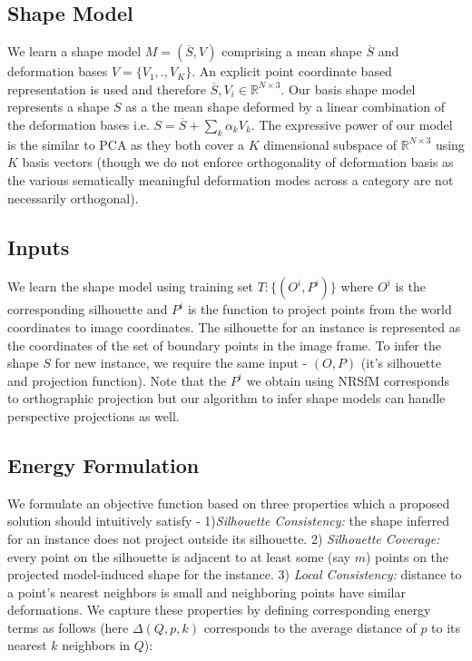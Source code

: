 
\subsection{Shape Model}
We learn a shape model $M = (\overline{S},V)$ comprising a mean shape $\overline{S}$ and deformation bases $V = \{ V_1,.,V_K \} $. An explicit point coordinate based representation is used and therefore $\overline{S}, V_i \in \mathbb{R}^{N \times 3}$. Our basis shape model represents a shape $S$ as a the mean shape deformed by a linear combination of the deformation bases i.e. $S = \overline{S} + \underset{k}{\sum}\alpha_{k} V_k$. The expressive power of our model is the similar to PCA as they both cover a $K$ dimensional subspace of $\mathbb{R}^{N \times 3}$ using $K$ basis vectors (though we do not enforce orthogonality of deformation basis as the various sematically meaningful deformation modes across a category are not necessarily orthogonal).

\subsection{Inputs}
We learn the shape model using training set $T:\{(O^i,P^i)\}$ where $O^i$ is the corresponding silhouette and $P^i$ is the function to project points from the world coordinates to image coordinates. The silhouette for an instance is represented as the coordinates of the set of boundary points in the image frame. To infer the shape $S$ for new instance, we require the same input - $(O,P)$ (it's silhouette and projection function). Note that the $P^i$ we obtain using NRSfM corresponds to orthographic projection but our algorithm to infer shape models can handle perspective projections as well.

\subsection{Energy Formulation}
We formulate an objective function based on three properties which a proposed solution should intuitively satisfy  - 1)\textit{Silhouette Consistency:} the shape inferred for an instance does not project outside its silhouette. 2) \textit{Silhouette Coverage:} every point on the silhouette is adjacent to at least some (say $m$)  points on the projected model-induced shape for the instance. 3) \textit{Local Consistency:} distance to a point's nearest neighbors is small and neighboring points have similar deformations. We capture these properties by defining corresponding energy terms as follows (here $\Delta(Q,p,k)$ corresponds to the average distance of $p$ to its nearest $k$ neighbors in $Q$):

